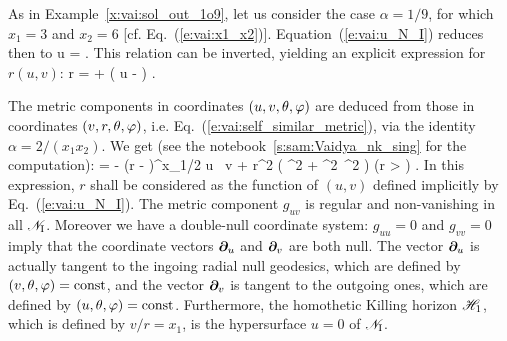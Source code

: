 \begin{example} \label{x:vai:u_r_1o9}
As in Example~\ref{x:vai:sol_out_1o9}, let us consider the case $\alpha=1/9$,
for which $x_1 = 3$ and $x_2 = 6$ [cf. Eq.~(\ref{e:vai:x1_x2})]. Equation~(\ref{e:vai:u_N_I})
reduces then to
\be
    u =  .
\ee
This relation can be inverted, yielding an explicit expression for $r(u, v)$:
\be \label{e:vai:r_uv_1o9}
    r =  +  \left( u -  \right) .
\ee
\end{example}

The metric components in coordinates $(u, v, \theta, \varphi)$
are deduced from those in coordinates $(v, r, \theta, \varphi)$, i.e.
Eq.~(\ref{e:vai:self_similar_metric}), via
the identity $\alpha=2/(x_1 x_2)$. We get
(see the notebook~\ref{s:sam:Vaidya_nk_sing} for the computation):
\be \label{e:vai:metric_N_I}
     = -  \left(r -  \right)^{x_1/2}
        \dd u \, \dd v
        + r^2 \left( \dd\th^2 + \sin^2\th\, \dd\ph^2 \right) \qquad
        \left(r > \right) .
\ee
In this expression, $r$ shall be considered as the function of $(u,v)$ defined
implicitly by Eq.~(\ref{e:vai:u_N_I}).
The metric component $g_{uv}$ is regular and non-vanishing in all $\mathscr{N}_{\rm I}$.
Moreover we have a double-null coordinate system:
$g_{uu} = 0$ and $g_{vv} = 0$ imply that the coordinate vectors $\bm{\partial}_u$
and $\bm{\partial}_v$ are both null. The vector $\bm{\partial}_u$ is actually tangent to the
ingoing radial null geodesics, which are defined by $(v,\theta,\varphi) = \mathrm{const}$,
and the vector $\bm{\partial}_v$ is tangent to the outgoing ones, which are defined
by $(u,\theta,\varphi) = \mathrm{const}$. Furthermore, the homothetic Killing horizon $\mathscr{H}_1$, which is defined by $v/r = x_1$, is the hypersurface
$u = 0$ of $\mathscr{N}_{\rm I}$.



